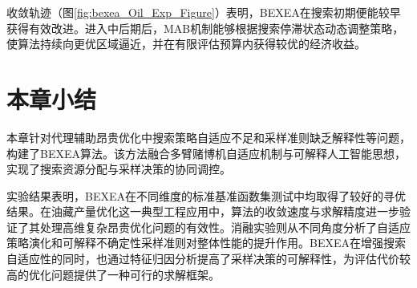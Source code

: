 收敛轨迹（图\ref{fig:bexea_Oil_Exp_Figure}）表明，BEXEA在搜索初期便能较早获得有效改进。进入中后期后，MAB机制能够根据搜索停滞状态动态调整策略，使算法持续向更优区域逼近，并在有限评估预算内获得较优的经济收益。

\section{本章小结}
本章针对代理辅助昂贵优化中搜索策略自适应不足和采样准则缺乏解释性等问题，构建了BEXEA算法。该方法融合多臂赌博机自适应机制与可解释人工智能思想，实现了搜索资源分配与采样决策的协同调控。

实验结果表明，BEXEA在不同维度的标准基准函数集测试中均取得了较好的寻优结果。在油藏产量优化这一典型工程应用中，算法的收敛速度与求解精度进一步验证了其处理高维复杂昂贵优化问题的有效性。消融实验则从不同角度分析了自适应策略演化和可解释不确定性采样准则对整体性能的提升作用。BEXEA在增强搜索自适应性的同时，也通过特征归因分析提高了采样决策的可解释性，为评估代价较高的优化问题提供了一种可行的求解框架。
